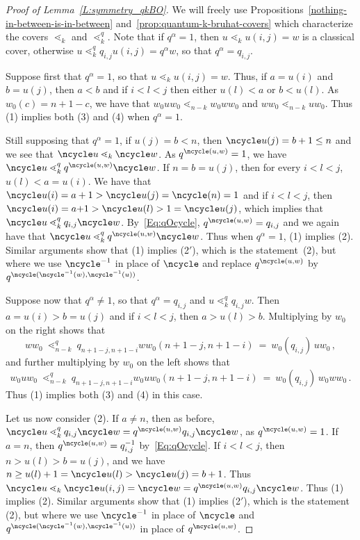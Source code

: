 \begin{proof}[Proof of Lemma~\ref{L:symmetry_qkBO}]
 We will freely use Propositions~\ref{nothing-in-between-is-in-between} and~\ref{prop:quantum-k-bruhat-covers} which
 characterize the covers $\lessdot_k$ and $\lessdot_k^q$.
 Note that if $q^\alpha=1$, then $u\lessdot_k u(i,j)=w$ is a classical cover, otherwise
 $u\lessdot_k^q  q_{i,j}u(i,j)=q^\alpha w$, so that $q^\alpha=q_{i,j}$.
 
 Suppose first that  $q^\alpha=1$, so that $u\lessdot_k u(i,j)=w$.
 Thus, if $a=u(i)$ and $b=u(j)$, then $a<b$ and if $i<l<j$ then either $u(l)<a$ or $b<u(l)$.
 As $w_0(c)=n{+}1{-}c$, we have that $w_0u w_0 \lessdot_{n-k} w_0 w w_0$ and  $w w_0 \lessdot_{n-k} u w_0$.
 Thus (1) implies both (3) and (4) when $q^\alpha=1$.


 Still supposing that $q^\alpha=1$, if $u(j)=b<n$, then $\ncycle u(j)=b+1\leq n$ and we see that 
 $\ncycle u \lessdot_k \ncycle w$.
 As $q^{\ncycle(u,w)}=1$, we have $\ncycle u \lessdot^q_k q^{\ncycle(u,w)} \ncycle w$.
 If $n=b=u(j)$, then for every $i<l<j$, $u(l)<a=u(i)$.
 We have that $\ncycle u(i)=a+1>\ncycle u(j)=\ncycle(n)=1$ and if  $i<l<j$, then
 $\ncycle u(i)=a{+}1>\ncycle u(l)>1=\ncycle u(j)$, which implies that $\ncycle u \lessdot^q_k q_{i,j} \ncycle w$.
 By~\eqref{Eq:qOcycle}, $q^{\ncycle(u,w)}=q_{i,j}$ and we again have that $\ncycle u \lessdot^q_k q^{\ncycle(u,w)} \ncycle w$.
 Thus when $q^\alpha=1$, (1) implies (2).
 Similar arguments show that (1) implies (2$'$), which is the statement~(2), but where we use $\ncycle^{-1}$ in place of
 $\ncycle$ and replace $q^{\ncycle(u,w)}$ by $q^{\ncycle(\ncycle^{-1}(w),\ncycle^{-1}(u))}$. 

 Suppose now that $q^\alpha\neq 1$, so that $q^\alpha=q_{i,j}$ and $u\lessdot^q_k q_{i,j} w$.
 Then $a=u(i)>b=u(j)$ and if $i<l<j$, then $a>u(l)>b$.
 Multiplying by $w_0$ on the right shows that
 \[
     w w_0\ \lessdot^q_{n-k}\ q_{n+1-j,n+1-i} w w_0 (n{+}1-j,n{+}1-i)\ =\  w_0(q_{i,j})\, u w_0\,,
 \]
 and further multiplying by $w_0$ on the left shows that
 \[
    w_0uw_0\  \lessdot^q_{n-k}\  q_{n+1-j,n+1-i} w_0 u w_0  (n{+}1-j,n{+}1-i)\ =\   w_0(q_{i,j})\, w_0 w w_0\,.
 \]
 Thus (1) implies both (3) and (4) in this case.

 Let us now consider (2).
 If $a\neq n$, then as before, $\ncycle u \lessdot_k^q  q_{i,j}\ncycle w=q^{\ncycle(u,w)} q_{i,j}\ncycle w$, as $q^{\ncycle(u,w)}=1$.
 If $a=n$, then $q^{\ncycle(u,w)}=q_{i,j}^{-1}$ by~\eqref{Eq:qOcycle}.
 If $i<l<j$, then $n>u(l)>b=u(j)$, and we have $n\geq u(l)+1 = \ncycle u(l)>\ncycle u(j)=b+1$.
 Thus $\ncycle u \lessdot_k \ncycle u(i,j)=\ncycle w= q^{\ncycle(u,w)} q_{i,j} \ncycle w$.
 Thus (1) implies (2).
 Similar arguments show that (1) implies (2$'$), which is the statement (2), but where we use $\ncycle^{-1}$ in place of
 $\ncycle$ and  $q^{\ncycle(\ncycle^{-1}(w),\ncycle^{-1}(u))}$ in place of $q^{\ncycle(u,w)}$. 


\end{proof}
